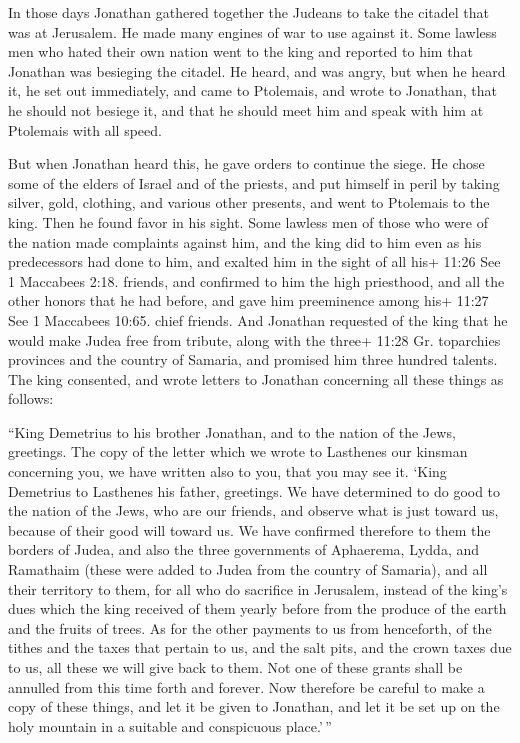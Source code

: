  In those days Jonathan gathered together the Judeans to
take the citadel that was at Jerusalem. He made many engines of war to
use against it.  Some lawless men who hated their own
nation went to the king and reported to him that Jonathan was besieging
the citadel.  He heard, and was angry, but when he heard
it, he set out immediately, and came to Ptolemais, and wrote to
Jonathan, that he should not besiege it, and that he should meet him and
speak with him at Ptolemais with all speed.

 But when Jonathan heard this, he gave orders to continue
the siege. He chose some of the elders of Israel and of the priests, and
put himself in peril  by taking silver, gold, clothing, and
various other presents, and went to Ptolemais to the king. Then he found
favor in his sight.  Some lawless men of those who were of
the nation made complaints against him,  and the king did
to him even as his predecessors had done to him, and exalted him in the
sight of all his+ 11:26 See 1 Maccabees 2:18. friends,  and
confirmed to him the high priesthood, and all the other honors that he
had before, and gave him preeminence among his+ 11:27 See 1 Maccabees
10:65. chief friends.  And Jonathan requested of the king
that he would make Judea free from tribute, along with the three+ 11:28
Gr. toparchies provinces and the country of Samaria, and promised him
three hundred talents.  The king consented, and wrote
letters to Jonathan concerning all these things as follows:

 ``King Demetrius to his brother Jonathan, and to the
nation of the Jews, greetings.  The copy of the letter
which we wrote to Lasthenes our kinsman concerning you, we have written
also to you, that you may see it.  `King Demetrius to
Lasthenes his father, greetings.  We have determined to do
good to the nation of the Jews, who are our friends, and observe what is
just toward us, because of their good will toward us.  We
have confirmed therefore to them the borders of Judea, and also the
three governments of Aphaerema, Lydda, and Ramathaim (these were added
to Judea from the country of Samaria), and all their territory to them,
for all who do sacrifice in Jerusalem, instead of the king's dues which
the king received of them yearly before from the produce of the earth
and the fruits of trees.  As for the other payments to us
from henceforth, of the tithes and the taxes that pertain to us, and the
salt pits, and the crown taxes due to us, all these we will give back to
them.  Not one of these grants shall be annulled from this
time forth and forever.  Now therefore be careful to make a
copy of these things, and let it be given to Jonathan, and let it be set
up on the holy mountain in a suitable and conspicuous place.'\,''

